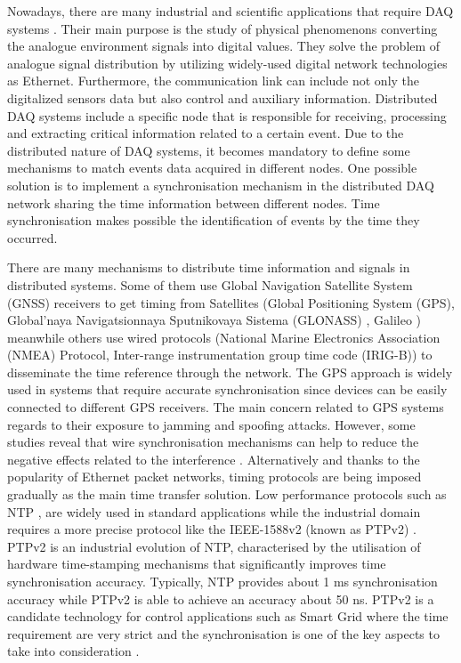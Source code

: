 Nowadays, there are many industrial \cite{daq:res} and scientific applications \cite{daq:sensor-networks} that require DAQ systems \cite{daq:book1}. Their main purpose is the study of physical phenomenons converting the analogue environment signals into digital values. They solve the problem of analogue signal distribution by utilizing  widely-used digital network technologies as Ethernet. Furthermore, the communication link can include not only the digitalized sensors data but also control and auxiliary information.
Distributed DAQ systems include a specific node that is responsible for receiving, processing and extracting critical information related to a certain event. Due to the distributed nature of DAQ systems, it becomes mandatory to define some mechanisms to match events data acquired in different nodes. One possible solution is to implement a synchronisation mechanism in the distributed DAQ network sharing the time information between different nodes. Time synchronisation makes possible the identification of events by the time they occurred.

There are many mechanisms to distribute time information and signals in distributed systems. Some of them use Global Navigation Satellite System (GNSS) receivers to get timing from Satellites (Global Positioning System (GPS), Global'naya Navigatsionnaya Sputnikovaya Sistema (GLONASS)  \cite{glonass:website}, Galileo \cite{gsa:galileo}) meanwhile others use wired protocols (National Marine Electronics Association (NMEA) Protocol, Inter-range instrumentation group time code (IRIG-B)) to disseminate the time reference through the network. The GPS approach is widely used in systems that require accurate synchronisation since devices can be easily connected to different GPS receivers. The main concern related to GPS systems regards to their exposure to jamming and spoofing attacks. However, some studies reveal that wire synchronisation mechanisms can help to reduce the negative effects related to the interference \cite{NOURA2016130}. Alternatively and thanks to the popularity of Ethernet packet networks, timing protocols are being imposed gradually as the main time transfer solution. Low performance protocols such as NTP \cite{ntf:ntp_std}, are widely used in standard applications while the industrial domain requires a more precise protocol like the IEEE-1588v2 (known as PTPv2) \cite{ieee:ieee1588_std} \cite{itu:TG8275_1_Y_1369_1}. PTPv2 is an industrial evolution of NTP, characterised by the utilisation of hardware time-stamping mechanisms that significantly improves time synchronisation accuracy. Typically, NTP provides about 1 ms synchronisation accuracy while PTPv2 is able to achieve an accuracy about 50 ns. PTPv2 is a candidate technology for control applications such as Smart Grid where the time requirement are very strict and the synchronisation is one of the key aspects to take into consideration \cite{NAFI201623} \cite{COLAK2016396}.

